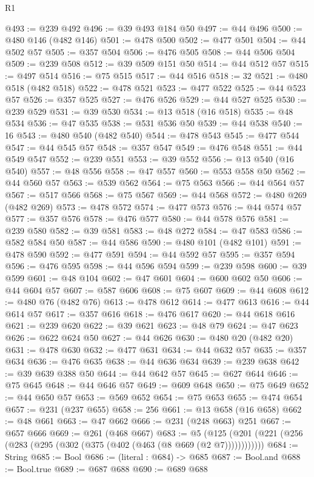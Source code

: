 \begin{lexlean}{R1}
\begin{coremodule}
@493 := @239 @492
@496 := @39 @493 @184 @50
@497 := @44 @496
@500 := @480 @146 (@482 @146)
@501 := @478 @500
@502 := @477 @501
@504 := @44 @502 @57
@505 := @357 @504
@506 := @476 @505
@508 := @44 @506 @504
@509 := @239 @508
@512 := @39 @509 @151 @50
@514 := @44 @512 @57
@515 := @497 @514
@516 := @75 @515
@517 := @44 @516
@518 := 32
@521 := @480 @518 (@482 @518)
@522 := @478 @521
@523 := @477 @522
@525 := @44 @523 @57
@526 := @357 @525
@527 := @476 @526
@529 := @44 @527 @525
@530 := @239 @529
@531 := @39 @530
@534 := @13 @518 (@16 @518)
@535 := @48 @534
@536 := @47 @535
@538 := @531 @536 @50
@539 := @44 @538
@540 := 16
@543 := @480 @540 (@482 @540)
@544 := @478 @543
@545 := @477 @544
@547 := @44 @545 @57
@548 := @357 @547
@549 := @476 @548
@551 := @44 @549 @547
@552 := @239 @551
@553 := @39 @552
@556 := @13 @540 (@16 @540)
@557 := @48 @556
@558 := @47 @557
@560 := @553 @558 @50
@562 := @44 @560 @57
@563 := @539 @562
@564 := @75 @563
@566 := @44 @564 @57
@567 := @517 @566
@568 := @75 @567
@569 := @44 @568
@572 := @480 @269 (@482 @269)
@573 := @478 @572
@574 := @477 @573
@576 := @44 @574 @57
@577 := @357 @576
@578 := @476 @577
@580 := @44 @578 @576
@581 := @239 @580
@582 := @39 @581
@583 := @48 @272
@584 := @47 @583
@586 := @582 @584 @50
@587 := @44 @586
@590 := @480 @101 (@482 @101)
@591 := @478 @590
@592 := @477 @591
@594 := @44 @592 @57
@595 := @357 @594
@596 := @476 @595
@598 := @44 @596 @594
@599 := @239 @598
@600 := @39 @599
@601 := @48 @104
@602 := @47 @601
@604 := @600 @602 @50
@606 := @44 @604 @57
@607 := @587 @606
@608 := @75 @607
@609 := @44 @608
@612 := @480 @76 (@482 @76)
@613 := @478 @612
@614 := @477 @613
@616 := @44 @614 @57
@617 := @357 @616
@618 := @476 @617
@620 := @44 @618 @616
@621 := @239 @620
@622 := @39 @621
@623 := @48 @79
@624 := @47 @623
@626 := @622 @624 @50
@627 := @44 @626
@630 := @480 @20 (@482 @20)
@631 := @478 @630
@632 := @477 @631
@634 := @44 @632 @57
@635 := @357 @634
@636 := @476 @635
@638 := @44 @636 @634
@639 := @239 @638
@642 := @39 @639 @388 @50
@644 := @44 @642 @57
@645 := @627 @644
@646 := @75 @645
@648 := @44 @646 @57
@649 := @609 @648
@650 := @75 @649
@652 := @44 @650 @57
@653 := @569 @652
@654 := @75 @653
@655 := @474 @654
@657 := @231 (@237 @655)
@658 := 256
@661 := @13 @658 (@16 @658)
@662 := @48 @661
@663 := @47 @662
@666 := @231 (@248 @663) @251
@667 := @657 @666
@669 := @261 (@468 @667)
@683 := @5 (@125 (@201 (@221 (@256 (@283 (@295 (@302 (@375 (@402 (@463 (@8 @669 (@2 @7))))))))))))
@684 := String
@685 := Bool
@686 := (literal : @684) -> @685
@687 := Bool.and
@688 := Bool.true
@689 := @687 @688
@690 := @689 @688

\end{coremodule}
\end{lexlean}
